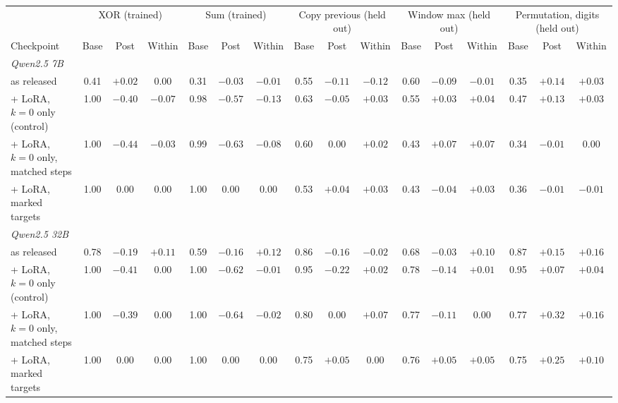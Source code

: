\begin{tabular}{l ccc ccc ccc ccc ccc}
\toprule
& \multicolumn{3}{c}{XOR (trained)} & \multicolumn{3}{c}{Sum (trained)} & \multicolumn{3}{c}{Copy previous (held out)} & \multicolumn{3}{c}{Window max (held out)} & \multicolumn{3}{c}{Permutation, digits (held out)} \\
\cmidrule(lr){2-4}\cmidrule(lr){5-7}\cmidrule(lr){8-10}\cmidrule(lr){11-13}\cmidrule(lr){14-16}
Checkpoint & Base & Post & Within & Base & Post & Within & Base & Post & Within & Base & Post & Within & Base & Post & Within \\
\midrule
\multicolumn{16}{l}{\emph{Qwen2.5 7B}} \\
\quad as released & 0.41 & $+0.02$ & 0.00 & 0.31 & $-0.03$ & $-0.01$ & 0.55 & $-0.11$ & $-0.12$ & 0.60 & $-0.09$ & $-0.01$ & 0.35 & $+0.14$ & $+0.03$ \\
\quad + LoRA, $k = 0$ only (control) & 1.00 & $-0.40$ & $-0.07$ & 0.98 & $-0.57$ & $-0.13$ & 0.63 & $-0.05$ & $+0.03$ & 0.55 & $\mathbf{+0.03}$ & $+0.04$ & 0.47 & $+0.13$ & $+0.03$ \\
\quad + LoRA, $k = 0$ only, matched steps & 1.00 & $-0.44$ & $-0.03$ & 0.99 & $-0.63$ & $-0.08$ & 0.60 & 0.00 & $+0.02$ & 0.43 & $\mathbf{+0.07}$ & $+0.07$ & 0.34 & $-0.01$ & 0.00 \\
\quad + LoRA, marked targets & 1.00 & 0.00 & 0.00 & 1.00 & 0.00 & 0.00 & 0.53 & $\mathbf{+0.04}$ & $+0.03$ & 0.43 & $-0.04$ & $+0.03$ & 0.36 & $-0.01$ & $-0.01$ \\
\midrule
\multicolumn{16}{l}{\emph{Qwen2.5 32B}} \\
\quad as released & 0.78 & $-0.19$ & $+0.11$ & 0.59 & $-0.16$ & $+0.12$ & 0.86 & $-0.16$ & $-0.02$ & 0.68 & $-0.03$ & $+0.10$ & 0.87 & $+0.15$ & $+0.16$ \\
\quad + LoRA, $k = 0$ only (control) & 1.00 & $-0.41$ & 0.00 & 1.00 & $-0.62$ & $-0.01$ & 0.95 & $-0.22$ & $+0.02$ & 0.78 & $-0.14$ & $+0.01$ & 0.95 & $+0.07$ & $+0.04$ \\
\quad + LoRA, $k = 0$ only, matched steps & 1.00 & $-0.39$ & 0.00 & 1.00 & $-0.64$ & $-0.02$ & 0.80 & 0.00 & $+0.07$ & 0.77 & $-0.11$ & 0.00 & 0.77 & $+0.32$ & $+0.16$ \\
\quad + LoRA, marked targets & 1.00 & 0.00 & 0.00 & 1.00 & 0.00 & 0.00 & 0.75 & $\mathbf{+0.05}$ & 0.00 & 0.76 & $\mathbf{+0.05}$ & $+0.05$ & 0.75 & $+0.25$ & $+0.10$ \\
\bottomrule
\end{tabular}
